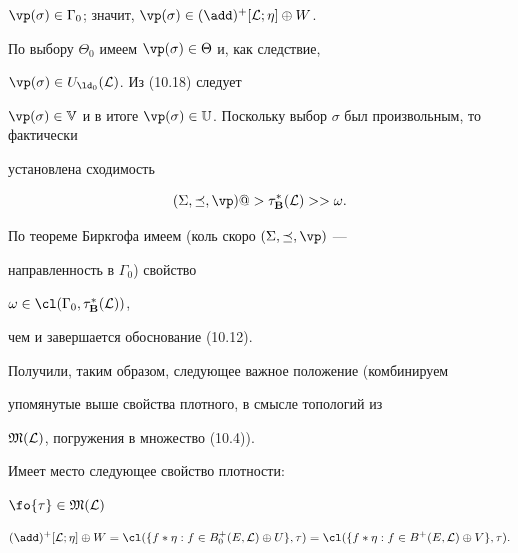 \begin{pf}
${{\vp}(\sigma)} \in {{\Gamma}_0}$; значит, ${{\vp}(\sigma)} \in


{(\add)^+}[{\cal L};\eta] \oplus W$.


По выбору ${\Theta}_0$ имеем ${{\vp}(\sigma)} \in \Theta$ и, как следствие,


${{\vp}(\sigma)} \in {U_{{\ld}_0}}({\cal L})$. Из (10.18) следует


${{\vp}(\sigma)} \in {\Bbb V}$ и в итоге ${{\vp}(\sigma)} \in


{\Bbb U}$. Поскольку выбор $\sigma$ был произвольным, то фактически


установлена сходимость


$$


(\Sigma,\preceq,\vp) @>{{\tau_{\bold B}^*}({\cal L})}>> \omega.


$$





По теореме Биркгофа имеем (коль скоро $(\Sigma,\preceq,\vp)$ ---


направленность в ${\Gamma}_0$) свойство


$\omega \in {\cl}({{\Gamma}_0},{\tau_{\bold B}^*}({\cal L}))$,


чем и завершается обоснование (10.12).


\end{pf}





Получили, таким образом, следующее важное положение (комбинируем


упомянутые выше свойства плотного, в смысле топологий из


${\frak M}({\cal L})$, погружения в множество (10.4)).





\begin{thms}


Имеет место следующее свойство плотности\/$:$


$\fo{\tau} \in {{\frak M}({\cal L})}$


$$


{(\add)^+}[{\cal L};\eta]


\oplus W = {\cl}(\{{f*\eta}:f \in {B_0^+}(E,{\cal L}) \oplus U\},


\tau) = {\cl}(\{{f*\eta}:f \in {B^+}(E,{\cal L}) \oplus V\},


\tau).


$$


\end{thms}





